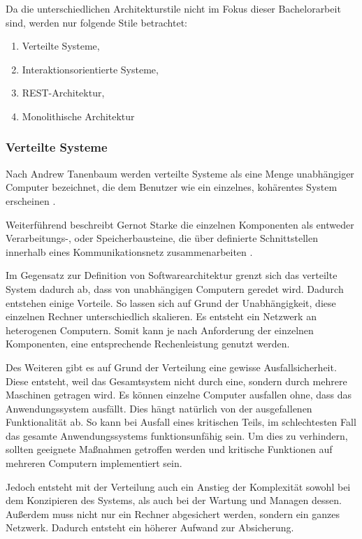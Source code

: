 Da die unterschiedlichen Architekturstile nicht im  Fokus dieser Bachelorarbeit sind, werden nur folgende Stile betrachtet:

\begin{enumerate}
	\item Verteilte Systeme,
	\item Interaktionsorientierte Systeme,
	\item REST-Architektur,
	\item Monolithische Architektur
\end{enumerate}


\subsubsection{Verteilte Systeme}
\label{sec:verteilte-systeme}

Nach Andrew Tanenbaum werden verteilte Systeme als eine Menge unabhängiger Computer bezeichnet, die dem Benutzer wie ein einzelnes, kohärentes System erscheinen \parencite{tanenbaum_verteilte_2007}.

Weiterführend beschreibt Gernot Starke die einzelnen Komponenten als entweder Verarbeitungs-, oder Speicherbausteine, die über definierte Schnittstellen innerhalb eines Kommunikationsnetz zusammenarbeiten \parencite[vgl.][S. 116]{starke_effektive_2015}.

Im Gegensatz zur Definition von Softwarearchitektur grenzt sich das verteilte System dadurch ab, dass von unabhängigen Computern geredet wird. Dadurch entstehen einige Vorteile. So lassen sich auf Grund der Unabhängigkeit, diese einzelnen Rechner unterschiedlich skalieren. Es entsteht ein Netzwerk an heterogenen Computern. Somit kann je nach Anforderung der einzelnen Komponenten, eine entsprechende Rechenleistung genutzt werden.

Des Weiteren gibt es auf Grund der Verteilung eine gewisse Ausfallsicherheit. Diese entsteht, weil das Gesamtsystem nicht durch eine, sondern durch mehrere Maschinen getragen wird. Es können einzelne Computer ausfallen ohne, dass das Anwendungssystem ausfällt. Dies hängt natürlich von der ausgefallenen Funktionalität ab. So kann bei Ausfall eines kritischen Teils,  im schlechtesten Fall das gesamte Anwendungssystems funktionsunfähig sein. Um dies zu verhindern, sollten geeignete Maßnahmen getroffen werden und kritische Funktionen auf mehreren Computern implementiert sein.

Jedoch entsteht mit der Verteilung auch ein Anstieg der Komplexität sowohl bei dem Konzipieren des Systems, als auch bei der Wartung und Managen dessen. Außerdem muss nicht nur ein Rechner abgesichert werden, sondern ein ganzes Netzwerk. Dadurch entsteht ein höherer Aufwand zur Absicherung.

